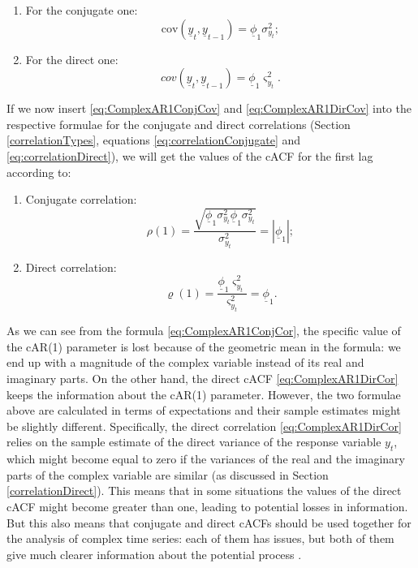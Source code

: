 \documentclass[
]{book}
\providecommand{\tightlist}{%
  \setlength{\itemsep}{0pt}\setlength{\parskip}{0pt}}
\begin{document}
\begin{enumerate}
\def\labelenumi{\arabic{enumi}.}
\tightlist
\item
  For the conjugate one:
  \begin{equation}
   \mathrm{cov}\left(\underline{y}_t, \underline{y}_{t-1} \right) = \underline{\phi}_1 \sigma^2_{y_t} ;
   \label{eq:ComplexAR1ConjCov}
  \end{equation}
\item
  For the direct one:
  \begin{equation}
   cov \left(\underline{y}_t, \underline{y}_{t-1} \right) = \underline{\phi}_1 \varsigma^2_{y_t} .
   \label{eq:ComplexAR1DirCov}
  \end{equation}
\end{enumerate}

If we now insert \eqref{eq:ComplexAR1ConjCov} and \eqref{eq:ComplexAR1DirCov} into the respective formulae for the conjugate and direct correlations (Section \ref{correlationTypes}, equations \eqref{eq:correlationConjugate} and \eqref{eq:correlationDirect}), we will get the values of the cACF for the first lag according to:

\begin{enumerate}
\def\labelenumi{\arabic{enumi}.}
\item
  Conjugate correlation:
  \begin{equation}
   \rho(1) = \frac{\sqrt{\underline{\phi}_1 \sigma^2_{y_t} \underline{\phi}_1 \sigma^2_{y_t}}}{\sigma_{y_t}^2} = | \underline{\phi}_1 |;
   \label{eq:ComplexAR1ConjCor}
  \end{equation}
\item
  Direct correlation:
  \begin{equation}
   \varrho(1) = \frac{\underline{\phi}_1 \varsigma^2_{y_t}}{\varsigma^2_{y_t}} = \underline{\phi}_1.
   \label{eq:ComplexAR1DirCor}
  \end{equation}
\end{enumerate}

As we can see from the formula \eqref{eq:ComplexAR1ConjCor}, the specific value of the cAR(1) parameter is lost because of the geometric mean in the formula: we end up with a magnitude of the complex variable instead of its real and imaginary parts. On the other hand, the direct cACF \eqref{eq:ComplexAR1DirCor} keeps the information about the cAR(1) parameter. However, the two formulae above are calculated in terms of expectations and their sample estimates might be slightly different. Specifically, the direct correlation \eqref{eq:ComplexAR1DirCor} relies on the sample estimate of the direct variance of the response variable \(y_t\), which might become equal to zero if the variances of the real and the imaginary parts of the complex variable are similar (as discussed in Section \ref{correlationDirect}). This means that in some situations the values of the direct cACF might become greater than one, leading to potential losses in information. But this also means that conjugate and direct cACFs should be used together for the analysis of complex time series: each of them has issues, but both of them give much clearer information about the potential process \citep[ provide some arguments to support this claim]{Zhou2015}.
\end{document}
